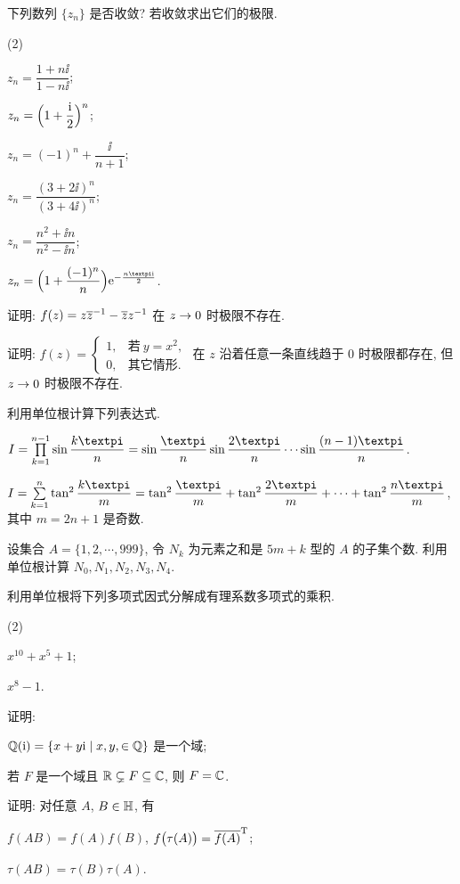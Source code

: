 \begin{homework}
\begin{homework}
    \item 下列数列 $\{z_n\}$ 是否收敛? 若收敛求出它们的极限.
    \begin{subhomework}[after-item-skip=2pt](2)
      \item $z_n=\dfrac{1+n\ii}{1-n\ii}$;
      \item $z_n=\Bigl(1+\dfrac {\mathrm{i}}2\Bigr)^n$;
      \item $z_n=(-1)^n+\dfrac{\ii}{n+1}$;
      \item $z_n=\dfrac{(3+2\ii)^n}{(3+4\ii)^n}$;
      \item $z_n=\dfrac{n^2+\ii n}{n^2-\ii n}$;
      \item $z_n=\Bigl(1+\dfrac{(-1)^n}n\Bigr)\ee^{-\frac{n\cpi \ii}2}$.
    \end{subhomework}
    \item 证明: $f(z)=z{\overline z}^{-1}-\overline zz^{-1}$ 在 $z\rightarrow 0$ 时极限不存在.
    \item 证明: $f(z)=\begin{cases}
      1,&\text{若}\ y=x^2,\\
      0,&\text{其它情形}.
    \end{cases}$ 在 $z$ 沿着任意一条直线趋于 $0$ 时极限都存在, 但 $z\rightarrow0$ 时极限不存在.
    \item \optionalex 利用单位根计算下列表达式.
      \begin{subhomework}
        \item $I=\prod\limits_{k=1}^{n-1}\sin\dfrac{k\cpi}n=\sin\dfrac{\cpi}n\sin\dfrac{2\cpi}n \cdots \sin\dfrac{(n-1)\cpi}n$.
        \item $I=\sum\limits_{k=1}^n\tan^2\dfrac{k\cpi}m=\tan^2\dfrac{\cpi}m+\tan^2\dfrac{2\cpi}m+\cdots+\tan^2\dfrac{n\cpi}m$, 其中 $m=2n+1$ 是奇数.
      \end{subhomework} 
    \item \optionalex 设集合 $A=\{1,2,\cdots,999\}$, 令 $N_k$ 为元素之和是 $5m+k$ 型的 $A$ 的子集个数. 利用单位根计算 $N_0,N_1,N_2,N_3,N_4$.
    \item \optionalex 利用单位根将下列多项式因式分解成有理系数多项式的乘积.
      \begin{subhomework}(2)
        \item $x^{10}+x^5+1$;
        \item $x^8-1$.
      \end{subhomework}
    \item \optionalex 证明: 
      \begin{subhomework}
        \item ${\mathbb{Q}}(\mathrm{i})=\{x+y\mathrm{i}\mid x,y,\in{\mathbb{Q}}\}$ 是一个域;
        \item 若 $F$ 是一个域且 ${\mathbb{R}}\subsetneq F\subseteq {\mathbb{C}}$, 则 $F={\mathbb{C}}$.
      \end{subhomework}
    \item \optionalex 证明: 对任意 $A$, $B\in{\mathbb{H}}$, 有
    \begin{subhomework}
      \item $f(AB)=f(A)f(B)$, $f\bigl(\tau(A)\bigr)=\overline{f(A)}^{{\mathrm{T}}}$;
      \item $\tau(AB)=\tau(B)\tau(A)$.
    \end{subhomework}
  \end{homework}
\end{homework}
\finishwidepage
